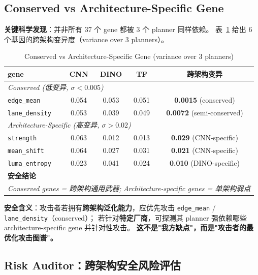 \documentclass[a4paper,12pt,fontset=fandol]{ctexart}
\newcommand{\gene}[1]{\texttt{#1}}
\newcommand{\planner}[1]{\textsf{#1}}
\begin{document}
{\subsection{Conserved vs Architecture-Specific Gene}

\noindent\textbf{关键科学发现}：并非所有 37 个 gene 都被 3 个 planner 同样依赖。
表~\ref{tab:gene_conserved} 给出 6 个基因的跨架构变异度（variance over 3 planners）。

\begin{table}[H]
\centering
\small
\caption{Conserved vs Architecture-Specific Gene (variance over 3 planners)}
\label{tab:gene_conserved}
\begin{tabular}{lcccc}
\toprule
\textbf{gene} & \planner{CNN} & \planner{DINO} & \planner{TF} & \textbf{跨架构变异} \\
\midrule
\multicolumn{5}{l}{\textit{Conserved (低变异, $\sigma < 0.005$)}} \\
\gene{edge\_mean}      & 0.054 & 0.053 & 0.051 & \textbf{0.0015} (conserved) \\
\gene{lane\_density}   & 0.053 & 0.039 & 0.049 & \textbf{0.0072} (semi-conserved) \\
\midrule
\multicolumn{5}{l}{\textit{Architecture-Specific (高变异, $\sigma > 0.02$)}} \\
\gene{strength}        & 0.063 & 0.012 & 0.013 & \textbf{0.029} (CNN-specific) \\
\gene{mean\_shift}      & 0.064 & 0.027 & 0.031 & \textbf{0.021} (CNN-specific) \\
\gene{luma\_entropy}    & 0.023 & 0.041 & 0.024 & \textbf{0.010} (DINO-specific) \\
\midrule
\multicolumn{5}{l}{\textbf{安全结论}} \\
\multicolumn{5}{l}{
  \footnotesize\textit{Conserved genes = 跨架构通用武器;}\quad
  \footnotesize\textit{Architecture-specific genes = 单架构弱点}
}
\end{tabular}
\end{table}

\noindent\textbf{安全含义}：攻击者若拥有\textbf{跨架构泛化能力}，应优先攻击
\gene{edge\_mean} / \gene{lane\_density}（conserved）；
若针对\textbf{特定厂商}，可探测其 planner 强依赖哪些
architecture-specific gene 并针对性攻击。
\textbf{这不是"我方缺点"，而是"攻击者的最优化攻击图谱"。}

\subsection{Risk Auditor：跨架构安全风险评估}

}
\end{document}
